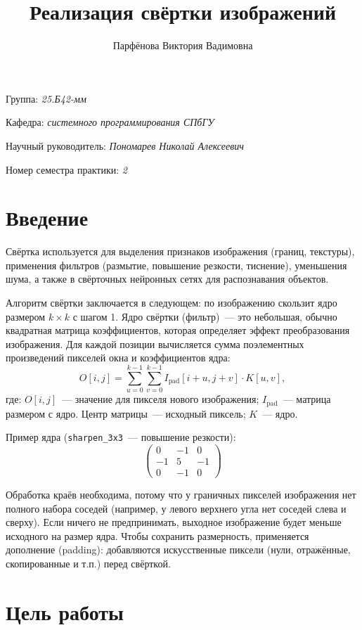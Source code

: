 \documentclass[a4paper]{article}
\title{Реализация свёртки изображений}
\author{Парфёнова Виктория Вадимовна}
\date{}
\begin{document}
\maketitle

\begin{flushright}
    Группа: \emph{25.Б42-мм}

    Кафедра: \emph{системного программирования СПбГУ}

    Научный руководитель: \emph{Пономарев Николай Алексеевич}
    
    Номер семестра практики: \emph{2}
\end{flushright} 

\section{Введение}

Свёртка используется для выделения признаков изображения (границ, текстуры), применения фильтров (размытие, повышение резкости, тиснение), уменьшения шума, а также в свёрточных нейронных сетях для распознавания объектов.

Алгоритм свёртки заключается в следующем: по изображению скользит ядро размером $k\times k$ с шагом 1. Ядро свёртки (фильтр)~--- это небольшая, обычно квадратная матрица коэффициентов, которая определяет эффект преобразования изображения. Для каждой позиции вычисляется сумма поэлементных произведений пикселей окна и коэффициентов ядра:
\[
        O[i,j] = \sum_{u=0}^{k-1} \sum_{v=0}^{k-1} I_{\text{pad}}[i+u, j+v] \cdot K[u,v],
\]
где:
$O[i,j]$~--- значение для пикселя нового изображения; $I_{\text{pad}}$~--- матрица размером с ядро. Центр матрицы~--- исходный пиксель; $K$~--- ядро.

Пример ядра (\texttt{sharpen\_3x3}~--- повышение резкости):
\[
\begin{pmatrix}
0 & -1 & 0 \\
-1 & 5 & -1 \\
0 & -1 & 0
\end{pmatrix}
\]

Обработка краёв необходима, потому что у граничных пикселей изображения нет полного набора соседей (например, у левого верхнего угла нет соседей слева и сверху). Если ничего не предпринимать, выходное изображение будет меньше исходного на размер ядра. Чтобы сохранить размерность, применяется дополнение (padding): добавляются искусственные пиксели (нули, отражённые, скопированные и т.п.) перед свёрткой.

\section{Цель работы}
\end{document}
